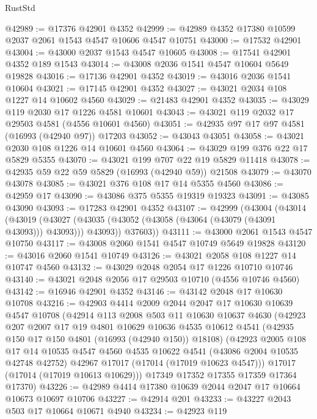 \begin{lexlean}{RustStd}
\begin{coremodule}
{\begin{coremodule}
{{{{{{{{{{{{{{{{{{{{{{{{{{{{{{{{{{{{{{{{{{{{{{{{{{{{{{{@42989 := @17376 @42901 @4352
@42999 := @42989 @4352 @17380 @10599 @2037 @2061 @1543 @4547 @10606 @4547 @10751
@43000 := @17532 @42901
@43004 := @43000 @2037 @1543 @4547 @10605
@43008 := @17541 @42901 @4352 @189 @1543
@43014 := @43008 @2036 @1541 @4547 @10604 @5649 @19828
@43016 := @17136 @42901 @4352
@43019 := @43016 @2036 @1541 @10604
@43021 := @17145 @42901 @4352
@43027 := @43021 @2034 @108 @1227 @14 @10602 @4560
@43029 := @21483 @42901 @4352
@43035 := @43029 @119 @2030 @17 @1226 @4581 @10601
@43043 := @43021 @119 @2032 @17 @29503 @4581 (@4556 @10601 @4560)
@43051 := @42935 @97 @17 @97 @4581 (@16993 (@42940 @97)) @17203
@43052 := @43043 @43051
@43058 := @43021 @2030 @108 @1226 @14 @10601 @4560
@43064 := @43029 @199 @376 @22 @17 @5829 @5355
@43070 := @43021 @199 @707 @22 @19 @5829 @11418
@43078 := @42935 @59 @22 @59 @5829 (@16993 (@42940 @59)) @21508
@43079 := @43070 @43078
@43085 := @43021 @376 @108 @17 @14 @5355 @4560
@43086 := @42959 @17
@43090 := @43086 @375 @5355 @19319 @19323
@43091 := @43085 @43090
@43093 := @17283 @42901 @4352
@43107 := @42999
    (@43004
      (@43014
        (@43019 (@43027 (@43035 (@43052 (@43058 (@43064 (@43079 (@43091 @43093))) @43093))) @43093))
        @37603))
@43111 := @43000 @2061 @1543 @4547 @10750
@43117 := @43008 @2060 @1541 @4547 @10749 @5649 @19828
@43120 := @43016 @2060 @1541 @10749
@43126 := @43021 @2058 @108 @1227 @14 @10747 @4560
@43132 := @43029 @2048 @2054 @17 @1226 @10710 @10746
@43140 := @43021 @2048 @2056 @17 @29503 @10710 (@4556 @10746 @4560)
@43142 := @16946 @42901 @4352
@43146 := @43142 @2048 @17 @10630 @10708
@43216 := @42903
    @4414
    @2009
    @2044
    @2047
    @17
    @10630
    @10639
    @4547
    @10708
    (@42914
      @113
      @2008
      @503
      @11
      @10630
      @10637
      @4630
      (@42923
        @207
        @2007
        @17
        @19
        @4801
        @10629
        @10636
        @4535
        @10612
        @4541
        (@42935 @150 @17 @150 @4801 (@16993 (@42940 @150)) @18108)
        (@42923
          @2005
          @108
          @17
          @14
          @10535
          @4547
          @4560
          @4535
          @10622
          @4541
          (@43086 @2004 @10535 @42748 @42752)
          @42967
          @17017
          (@17014 (@17019 @10623 @4547)))
        @17017
        (@17014 (@17019 @10613 @10629)))
      @17349
      @17352
      @17355
      @17359
      @17364
      @17370)
@43226 := @42989 @4414 @17380 @10639 @2044 @2047 @17 @10664 @10673 @10697 @10706
@43227 := @42914 @201
@43233 := @43227 @2043 @503 @17 @10664 @10671 @4940
@43234 := @42923 @119
}}}}}}}}}}}}}}}}}}}}}}}}}}}}}}}}}}}}}}}}}}}}}}}}}}}}}}}
\end{coremodule}}
\end{coremodule}
\end{lexlean}
